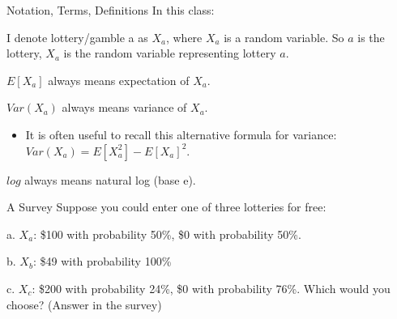 \documentclass[aspectratio=169]{beamer}
\newenvironment{wideitemize}{\itemize\addtolength{\itemsep}{10pt}}{\enditemize}
\begin{document}
\begin{frame}{Notation, Terms, Definitions}
In this class:
    \begin{wideitemize}
            \item I denote lottery/gamble a as $X_a$, where $X_a$ is a random variable. So $a$ is the lottery, $X_a$ is the random variable representing lottery $a$.
            \item $E[X_a]$ always means expectation of $X_a$. 
            \item $Var(X_a)$ always means variance of $X_a$.
            \begin{itemize}
                \item It is often useful to recall this alternative formula for variance: $Var(X_a)=E[X_a^2]-E[X_a]^2$.
            \end{itemize}
            \item $log$ always means natural log (base e).
    \end{wideitemize}
\end{frame}
\begin{frame}{A Survey}
    Suppose you could enter one of three lotteries for free:
    \begin{wideitemize}
        \item[a.] $X_a$: \$100 with probability 50\%, \$0 with probability 50\%.
        \item[b.] $X_b$: \$49 with probability 100\%
        \item[c.] $X_c$: \$200 with probability 24\%, \$0 with probability 76\%.
    \end{wideitemize}
    Which would you choose? (Answer in the survey)
\end{frame}
 
\end{document}
